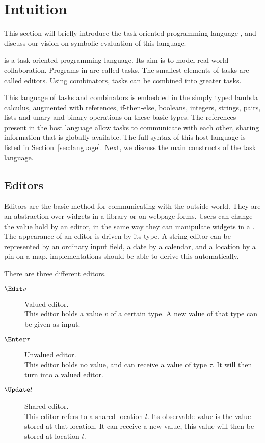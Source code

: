 
\section{Intuition}
\label{sec:intuition}

This section will briefly introduce the task-oriented programming language \TOPHAT,
and discuss our vision on symbolic evaluation of this language.

\TOPHAT is a task-oriented programming language.
Its aim is to model real world collaboration.
Programs in \TOPHAT are called tasks.
The smallest elements of tasks are called editors.
Using combinators, tasks can be combined into greater tasks.

This language of tasks and combinators is embedded in the simply typed lambda calculus,
augmented with references, if-then-else, booleans, integers, strings, pairs, lists and unary and binary operations on these basic types.
The references present in the host language allow tasks to communicate with each other,
sharing information that is globally available.
The full syntax of this host language is listed in Section~\ref{sec:language}.
Next, we discuss the main constructs of the task language.


\subsection{Editors}

Editors are the basic method for communicating with the outside world.
They are an abstraction over widgets in a \GUI library or on webpage forms.
Users can change the value hold by an editor,
in the same way they can manipulate widgets in a \GUI.
The appearance of an editor is driven by its type.
A string editor can be represented by an ordinary input field,
a date by a calendar, and a location by a pin on a map.
\TOP implementations should be able to derive this automatically.

There are three different editors.
\begin{description}
  \item[$\Edit v$] Valued editor.\\
    This editor holds a value $v$ of a certain type.
    A new value of that type can be given as input.
  \item[$\Enter \tau$] Unvalued editor.\\
    This editor holds no value, and can receive a value of type $\tau$.
    It will then turn into a valued editor.
  \item[$\Update l$] Shared editor.\\
    This editor refers to a shared location $l$.
    Its observable value is the value stored at that location.
    It can receive a new value, this value will then be stored at location $l$.
\end{description}



